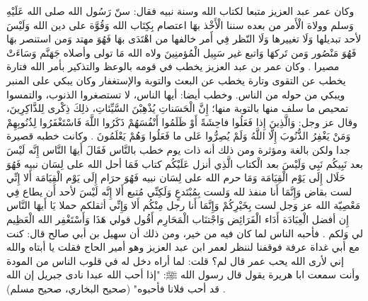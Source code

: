 وكان عمر عبد العزيز متبعا لكتاب الله وسنة نبيه فقال: سنّ رَسُول الله صلى الله عَلَيْهِ وَسلم وولاة الْأَمر من بعده سننا الْأَخْذ بهَا اعتصام بِكِتَاب الله وَقُوَّة على دين الله وَلَيْسَ لأحد تبديلها وَلَا تغييرها وَلَا النّظر فِي أَمر خالفها من اهْتَدَى بهَا فَهُوَ مهتد وَمن استنصر بهَا فَهُوَ مَنْصُور وَمن تَركهَا وَاتبع غير سَبِيل الْمُؤمنِينَ ولاه الله مَا تولى وأصلاه جَهَنَّم وَسَاءَتْ مصيرا \cite{ibnAbdAlHakam_OmarIbnAbdAlAziz}.  وكان عمر بن عبد العزيز يخطب في قومه بالوعظ والتذكير بأمر الله فتارة يخطب عن التقوى وتارة يخطب عن البعث والتوبة والإستغفار وكان يبكي على المنبر ويبكي من حوله من الناس. وخطب أيضا: أيها الناس، لا تستصغروا الذنوب، والتمسوا تمحيص ما سلف منها بالتوبة منها؛ إِنَّ الْحَسَناتِ يُذْهِبْنَ السَّيِّئاتِ، ذلِكَ ذِكْرى لِلذَّاكِرِينَ، وقال عز وجل: وَالَّذِينَ إِذا فَعَلُوا فاحِشَةً أَوْ ظَلَمُوا أَنْفُسَهُمْ ذَكَرُوا اللَّهَ فَاسْتَغْفَرُوا لِذُنُوبِهِمْ وَمَنْ يَغْفِرُ الذُّنُوبَ إِلَّا اللَّهُ وَلَمْ يُصِرُّوا عَلى ما فَعَلُوا وَهُمْ يَعْلَمُونَ \cite{ibnAbdRabbih_AlIqd}. وكانت خطبه قصيرة جدا ولكن بالغة ومؤثرة ومن ذلك أنه ذات يوم خطب بالنَّاس فَقَالَ أَيهَا النَّاس إِنَّه لَيْسَ بعد نَبِيكُم نَبِي وَلَيْسَ بعد الْكتاب الَّذِي أنزل عَلَيْكُم كتاب فَمَا أحل الله على لِسَان نبيه فَهُوَ حَلَال إِلَى يَوْم الْقِيَامَة وَمَا حرم الله على لِسَان نبيه فَهُوَ حرَام إِلَى يَوْم الْقِيَامَة أَلا إِنِّي لست بقاض وَإِنَّمَا أَنا منفذ لله وَلست بِمُبْتَدعٍ وَلَكِنِّي مُتبع أَلا إِنَّه لَيْسَ لأحد أَن يطاع فِي مَعْصِيّة الله عز وَجل لست بِخَيْرِكُمْ وَإِنَّمَا أَنا رجل مِنْكُم أَلا وَإِنِّي أثقلكم حملا يَا أَيهَا النَّاس إِن أفضل الْعِبَادَة أَدَاء الْفَرَائِض وَاجْتنَاب الْمَحَارِم أَقُول قولي هَذَا وَأَسْتَغْفِر الله الْعَظِيم لي وَلكم \cite{ibnAbdAlHakam_OmarIbnAbdAlAziz}. فأحبه الناس لما كان فيه من خير، ومن ذلك أن سهيل بن أبي صالح قال: كنت مع أبي غداة عرفة فوقفنا لننظر لعمر ابن عبد العزيز وهو أمير الحاج فقلت يا أبتاه والله إني لأرى الله يحب عمر قال لم؟ قلت: لما أراه دخل له في قلوب الناس من المودة وأنت سمعت ابا هريرة يقول قال رسول الله ﷺ: "إذا أحب الله عبدا نادى جبريل إن الله قد أحب فلانا فأحبوه" {\footnotesize (صحيح البخاري، صحيح مسلم)} \cite{dahabi_Siyar}.

